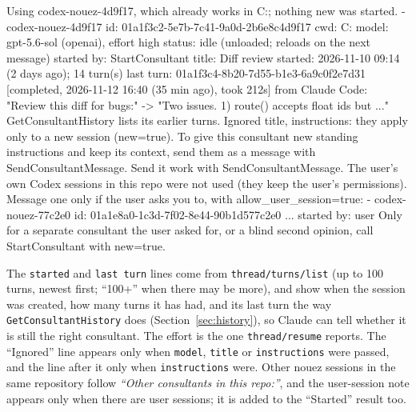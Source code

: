 \documentclass[10pt,a4paper]{article}
\newcommand{\code}[1]{\texttt{#1}}
\begin{document}
\begin{plain}
Using codex-nouez-4d9f17, which already works in C:\Users\you\Projects\nouez; nothing new was started.
- codex-nouez-4d9f17
    id: 01a1f3c2-5e7b-7c41-9a0d-2b6e8c4d9f17
    cwd: C:\Users\you\Projects\nouez
    model: gpt-5.6-sol (openai), effort high
    status: idle (unloaded; reloads on the next message)
    started by: StartConsultant
    title: Diff review
    started: 2026-11-10 09:14 (2 days ago); 14 turn(s)
    last turn: 01a1f3c4-8b20-7d55-b1e3-6a9c0f2e7d31 [completed, 2026-11-12 16:40 (35 min ago), took 212s] from Claude Code: "Review this diff for bugs:" -> "Two issues. 1) route() accepts float ids but ..."
    GetConsultantHistory lists its earlier turns.
Ignored title, instructions: they apply only to a new session (new=true).
To give this consultant new standing instructions and keep its context, send them as a message with SendConsultantMessage.
Send it work with SendConsultantMessage.
The user's own Codex sessions in this repo were not used (they keep the user's permissions). Message one only if the user asks you to, with allow_user_session=true:
- codex-nouez-77c2e0
    id: 01a1e8a0-1c3d-7f02-8e44-90b1d577c2e0
    ...
    started by: user
Only for a separate consultant the user asked for, or a blind second opinion, call StartConsultant with new=true.
\end{plain}

The \code{started} and \code{last turn} lines come from \code{thread/turns/list} (up to 100
turns, newest first; ``100+'' when there may be more), and show when the session was created, how
many turns it has had, and its last turn the way \code{GetConsultantHistory} does
(Section~\ref{sec:history}), so Claude can tell whether it is still the right consultant. The
effort is the one \code{thread/resume} reports. The ``Ignored'' line appears only when
\code{model}, \code{title} or \code{instructions} were passed, and the line after it only
when \code{instructions} were. Other nouez sessions in the same
repository follow \emph{``Other consultants in this repo:''}, and the user-session note appears
only when there are user sessions; it is added to the ``Started'' result too.
\end{document}
